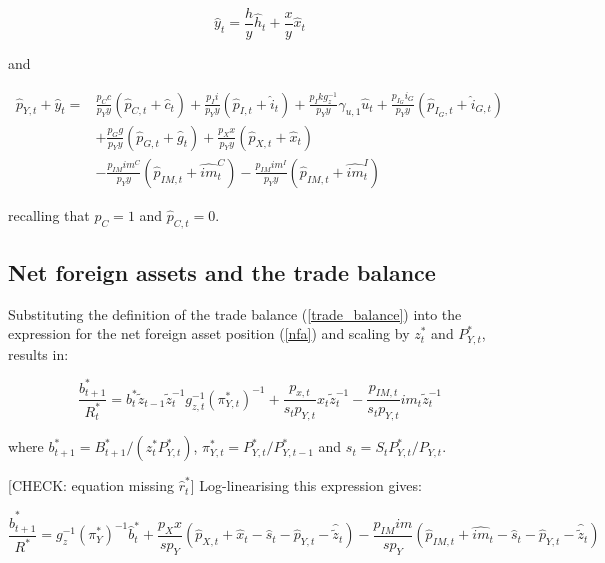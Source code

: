 \documentclass[a4paper,11pt]{article}
\numberwithin{equation}{section}
\begin{document}
	\begin{equation}
	\hat{y}_t=\frac{h}{y}\hat{h}_t+\frac{x}{y}\hat{x}_t
	\end{equation}
	
	and
	
	\begin{align}
	\hat{p}_{Y,t}+\hat{y}_t=&\frac{p_Cc}{p_Yy}\left(\hat{p}_{C,t}+\hat{c}_t\right)+\frac{p_Ii}{p_Yy}\left(\hat{p}_{I,t}+\hat{i}_t\right)+\frac{p_Ikg_z^{-1}}{p_Yy}\gamma_{u,1}\hat{u}_t+\frac{p_{I_G}i_G}{p_Yy}\left(\hat{p}_{I_G,t}+\hat{i}_{G,t}\right)\nonumber\\
	&+\frac{p_Gg}{p_Yy}\left(\hat{p}_{G,t}+\hat{g}_t\right)+\frac{p_Xx}{p_Yy}\left(\hat{p}_{X,t}+\hat{x}_t\right)\nonumber\\
	&-\frac{p_{IM}im^C}{p_Yy}\left(\hat{p}_{IM,t}+\hat{im}_t^C\right)-\frac{p_{IM}im^I}{p_Yy}\left(\hat{p}_{IM,t}+\hat{im}_t^I\right)
	\end{align}
	
	recalling that $p_C=1$ and $\hat{p}_{C,t}=0$.
	
	\subsection{Net foreign assets and the trade balance}
	
	Substituting the definition of the trade balance (\ref{trade_balance}) into the expression for the net foreign asset position (\ref{nfa}) and scaling by $z_t^*$ and $P_{Y,t}^*$, results in:
	
	\begin{equation}
	\frac{b_{t+1}^*}{R_t^*}=b_t^*\tilde{z}_{t-1}\tilde{z}_t^{-1}g_{z,t}^{-1}\left(\pi_{Y,t}^*\right)^{-1}+\frac{p_{x,t}}{s_tp_{Y,t}}x_t\tilde{z}_t^{-1}-\frac{p_{IM,t}}{s_tp_{Y,t}}{im}_t\tilde{z}_t^{-1}
	\end{equation}
	
	where $b_{t+1}^*=B_{t+1}^*/\left(z_t^*P_{Y,t}^*\right)$, $\pi_{Y,t}^*=P_{Y,t}^*/P_{Y,t-1}^*$ and $s_t=S_tP_{Y,t}^*/P_{Y,t}$.
	
	{\color{red} [CHECK: equation missing $\hat{r}^{*}_t$] Log-linearising this expression gives:}
	
	\begin{equation}
	\frac{\hat{b}_{t+1}^*}{R^*}=g_z^{-1}\left(\pi_Y^*\right)^{-1}\hat{b}_t^*+\frac{p_Xx}{sp_Y}\left(\hat{p}_{X,t}+\hat{x}_t-\hat{s}_t-\hat{p}_{Y,t}-\hat{\tilde{z}}_t\right)-\frac{p_{IM}im}{sp_Y}\left(\hat{p}_{IM,t}+\widehat{im}_t-\hat{s}_t-\hat{p}_{Y,t}-\hat{\tilde{z}}_t\right)
	\end{equation}
	
\end{document}
